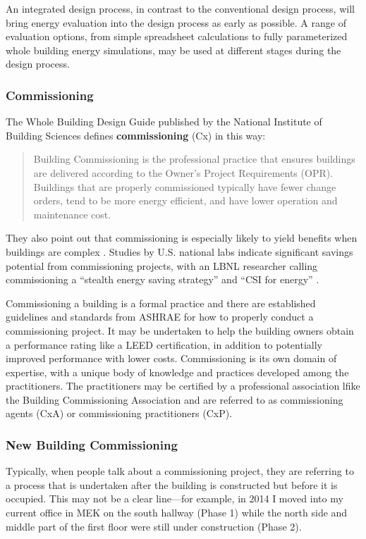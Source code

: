 \documentclass[10pt]{article}
\begin{document}
An integrated design process, in contrast to the conventional design process, will bring energy evaluation into the design process as early as possible. A range of evaluation options, from simple spreadsheet calculations to fully parameterized whole building energy simulations, may be used at different stages during the design process. 

\subsubsection{Commissioning}

The Whole Building Design Guide published by the National Institute of Building Sciences defines \textbf{commissioning} (Cx) in this way:

\begin{quote}
  Building Commissioning is the professional practice that ensures buildings are delivered according to the Owner's Project Requirements (OPR). Buildings that are properly commissioned typically have fewer change orders, tend to be more energy efficient, and have lower operation and maintenance cost.   \cite{bldgcx}
\end{quote}

They also point out that commissioning is especially likely to yield benefits when buildings are complex  \cite{bldgcx}. Studies by U.S. national labs indicate significant savings potential from commissioning projects, with an LBNL researcher calling commissioning a ``stealth energy saving strategy'' and ``CSI for energy'' \cite{mills}.

Commissioning a building is a formal practice and there are established guidelines and standards from ASHRAE for how to properly conduct a commissioning project. It may be undertaken to help the building owners obtain a performance rating like a LEED certification, in addition to potentially improved performance with lower costs. Commissioning is its own domain of expertise, with a unique body of knowledge and practices developed among the practitioners. The practitioners may be certified by a professional association lfike the Building Commissioning Association and are referred to as commissioning agents (CxA) or commissioning practitioners (CxP).

\subsubsection{New Building Commissioning}

Typically, when people talk about a commissioning project, they are referring to a process that is undertaken after the building is constructed but before it is occupied. This may not be a clear line---for example, in 2014 I moved into my current office in MEK on the south hallway (Phase 1) while the north side and middle part of the first floor were still under construction (Phase 2).
\end{document}
